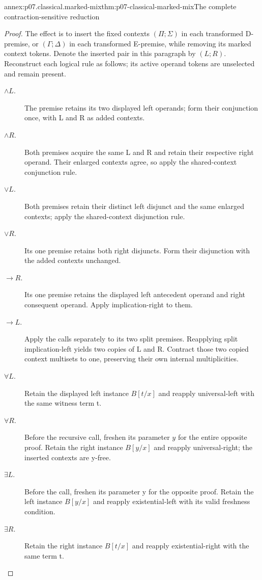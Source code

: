 \begin{annexitem}{annex:p07.classical.marked-mix}{thm:p07-classical-marked-mix}{The complete contraction-sensitive reduction}
\begin{proof}
The effect is to insert the fixed contexts \((\Pi;\Sigma)\) in each
transformed D-premise, or \((\Gamma;\Delta)\) in each transformed
E-premise, while removing its marked context tokens. Denote the inserted
pair in this paragraph by \((L;R)\). Reconstruct each logical rule as
follows; its active operand tokens are unselected and remain present.
\begin{description}
\item[\(\land L\).] The premise retains its two displayed left operands;
form their conjunction once, with L and R as added contexts.
\item[\(\land R\).] Both premises acquire the same L and R and retain
their respective right operand. Their enlarged contexts agree, so apply
the shared-context conjunction rule.
\item[\(\lor L\).] Both premises retain their distinct left disjunct and
the same enlarged contexts; apply the shared-context disjunction rule.
\item[\(\lor R\).] Its one premise retains both right disjuncts. Form
their disjunction with the added contexts unchanged.
\item[\(\to R\).] Its one premise retains the displayed left antecedent
operand and right consequent operand. Apply implication-right to them.
\item[\(\to L\).] Apply the calls separately to its two split premises.
Reapplying split implication-left yields two copies of L and R. Contract
those two copied context multisets to one, preserving their own internal
multiplicities.
\item[\(\forall L\).] Retain the displayed left instance \(B[t/x]\) and
reapply universal-left with the same witness term t.
\item[\(\forall R\).] Before the recursive call, freshen its parameter
\(y\) for the entire opposite proof. Retain the right instance \(B[y/x]\) and
reapply universal-right; the inserted contexts are y-free.
\item[\(\exists L\).] Before the call, freshen its parameter y for the
opposite proof. Retain the left instance \(B[y/x]\) and reapply
existential-left with its valid freshness condition.
\item[\(\exists R\).] Retain the right instance \(B[t/x]\) and reapply
existential-right with the same term t.
\end{description}


\end{proof}
\end{annexitem}
